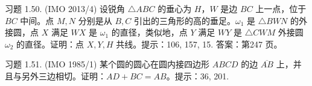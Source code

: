 \begin{exercise}
    习题 1.50. (IMO 2013/4) 设锐角 $\triangle ABC$ 的垂心为 $H$，$W$ 是边 $BC$ 上一点，位于 $BC$ 中间。点 $M, N$ 分别是从 $B, C$ 引出的三角形的高的垂足。$\omega_1$ 是 $\triangle BWN$ 的外接圆，点 $X$ 满足 $WX$ 是 $\omega_1$ 的直径，类似地，点 $Y$ 满足 $WY$ 是 $\triangle CWM$ 外接圆 $\omega_2$ 的直径。证明：点 $X, Y, H$ 共线。提示：106, 157, 15. 答案：第247 页。
\end{exercise}

\begin{exercise}
    习题 1.51. (IMO 1985/1) 某个圆的圆心在圆内接四边形 $ABCD$ 的边 $\overline{AB}$ 上，并且与另外三边相切。证明：$AD + BC = AB$。提示：36, 201.
\end{exercise}